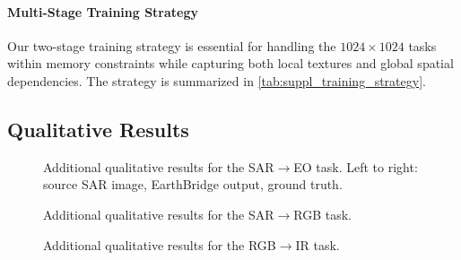 \paragraph{Multi-Stage Training Strategy}
{\color{gray}
Our two-stage training strategy is essential for handling the $1024\times1024$ tasks within memory constraints while capturing both local textures and global spatial dependencies. The strategy is summarized in \cref{tab:suppl_training_strategy}.

\begin{table}[h]
\centering
\caption{{\color{gray}Two-stage training strategy for high-resolution tasks.}}
\label{tab:suppl_training_strategy}
{\color{gray}
%
}
\end{table}
}

\subsection{Qualitative Results}
\label{sec:suppl_qualitative}

\begin{figure}[t]
    \centering
    \fbox{\rule{0pt}{3in} \rule{0.95\textwidth}{0pt}}
    \caption{{\color{gray}Additional qualitative results for the SAR$\rightarrow$EO task. Left to right: source SAR image, EarthBridge output, ground truth. }}
    \label{fig:suppl_sar2eo}
\end{figure}

\begin{figure}[t]
    \centering
    \fbox{\rule{0pt}{3in} \rule{0.95\textwidth}{0pt}}
    \caption{{\color{gray}Additional qualitative results for the SAR$\rightarrow$RGB task. }}
    \label{fig:suppl_sar2rgb}
\end{figure}

\begin{figure}[t]
    \centering
    \fbox{\rule{0pt}{3in} \rule{0.95\textwidth}{0pt}}
    \caption{{\color{gray}Additional qualitative results for the RGB$\rightarrow$IR task. }}
    \label{fig:suppl_rgb2ir}
\end{figure}

